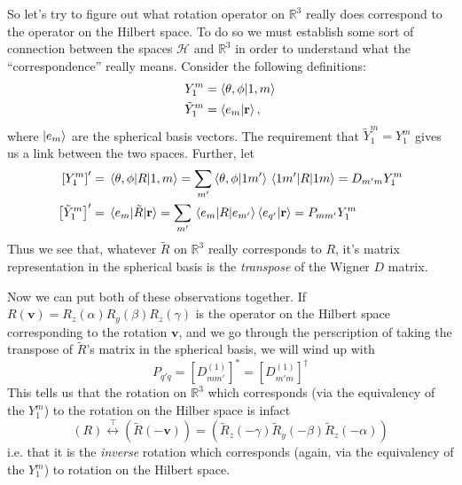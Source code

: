 \documentclass[12pt]{article}
\begin{document}
So let's try to figure out what rotation operator on $\mathbb{R}^3$ really does correspond to the operator on the Hilbert space. To do so we must establish some sort of connection between the spaces $\mathcal{H}$ and $\mathbb{R}^3$ in order to understand what the ``correspondence'' really means. Consider the following definitions:
\begin{align*}
    Y_1^m &= \braket{\theta, \phi}{1, m} \\
    \tilde{Y}_1^m &= \braket{e_m}{\mathbf{r}},
\end{align*}
where $\ket{e_m}$ are the spherical basis vectors. The requirement that $\tilde{Y}_1^m = Y_1^m$ gives us a link between the two spaces. Further, let
\begin{align*}
    \left[Y_1^m\right]' &= \mel{\theta, \phi}{R}{1, m} = \sum_{m'}\braket{\theta, \phi}{1 m'}\mel{1 m'}{R}{1 m} = D_{m'm}Y_1^m \\
    \left[\tilde{Y}_1^m\right]' &= \mel{e_m}{\tilde{R}}{\mathbf{r}} = \sum_{m'} \mel{e_m}{R}{e_{m'}}\braket{e_{q'}}{\mathbf{r}} = P_{mm'}Y_1^m
\end{align*}
Thus we see that, whatever $\tilde{R}$ on $\mathbb{R}^3$ really corresponds to $R$, it's matrix representation in the spherical basis is the \textit{transpose} of the Wigner $D$ matrix. 

Now we can put both of these observations together. If $R(\mathbf{v}) = R_z(\alpha)R_y(\beta)R_z(\gamma)$ is the operator on the Hilbert space corresponding to the rotation $\mathbf{v}$, and we go through the perscription of taking the transpose of $\tilde{R}$'s matrix in the spherical basis, we will wind up with
\[ P_{q'q} = \left[D_{mm'}^{(1)}\right]^* = \left[D_{m'm}^{(1)}\right]^\dag \]
This tells us that the rotation on $\mathbb{R}^3$ which corresponds (via the equivalency of the $Y_1^m$) to the rotation on the Hilber space is infact
\[ (R) \overset{\intercal}{\leftrightarrow} (\tilde{R}(-\mathbf{v})) = (\tilde{R}_z(-\gamma)\tilde{R}_y(-\beta)\tilde{R}_z(-\alpha)) \]
i.e. that it is the \textit{inverse} rotation which corresponds (again, via the equivalency of the $Y_1^m$) to rotation on the Hilbert space.
\end{document}
